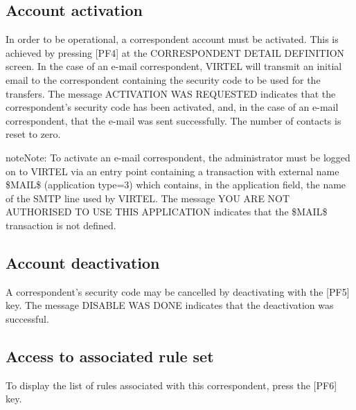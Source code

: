\documentclass[letterpaper,10pt,english]{sphinxmanual}
\begin{document}
\subsection{Account activation}
\label{\detokenize{audit_operations_ and_performance:index-52}}\label{\detokenize{audit_operations_ and_performance:account-activation}}
In order to be operational, a correspondent account must be activated. This is achieved by pressing {[}PF4{]} at the CORRESPONDENT DETAIL DEFINITION screen. In the case of an e-mail correspondent, VIRTEL will transmit an initial email to the correspondent containing the security code to be used for the transfers. The message ACTIVATION WAS REQUESTED indicates that the correspondent’s security code has been activated, and, in the case of an e-mail
correspondent, that the e-mail was sent successfully. The number of contacts is reset to zero.

\begin{sphinxadmonition}{note}{Note:}
To activate an e-mail correspondent, the administrator must be logged on to VIRTEL via an entry point containing a transaction with external name \$MAIL\$ (application type=3) which contains, in the application field, the name of the SMTP line used by VIRTEL. The message YOU ARE NOT AUTHORISED TO USE THIS APPLICATION indicates that the \$MAIL\$ transaction is not defined.
\end{sphinxadmonition}


\subsection{Account deactivation}
\label{\detokenize{audit_operations_ and_performance:index-53}}\label{\detokenize{audit_operations_ and_performance:account-deactivation}}
A correspondent’s security code may be cancelled by deactivating with the {[}PF5{]} key. The message DISABLE WAS DONE indicates that the deactivation was successful.


\subsection{Access to associated rule set}
\label{\detokenize{audit_operations_ and_performance:access-to-associated-rule-set}}\label{\detokenize{audit_operations_ and_performance:index-54}}
To display the list of rules associated with this correspondent, press the {[}PF6{]} key.
\end{document}
